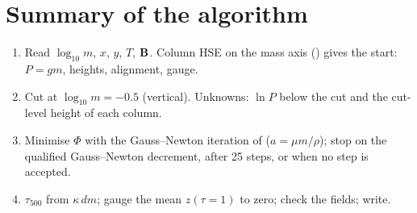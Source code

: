\adjointpoissontrue


\section{Summary of the algorithm}
\begin{enumerate}
\item Read $\log_{10}m$, $x$, $y$, $T$, $\mathbf B$. Column HSE on the mass axis () gives the start: $P=gm$, heights,
alignment, gauge.
\item Cut at $\log_{10}m=-0.5$ (vertical). Unknowns: $\ln P$ below the cut and the cut-level height of each column.
\item Minimise $\Phi$ with the Gauss--Newton iteration of  ($a=\mu m/\rho$); stop on the qualified
Gauss--Newton decrement, after 25 steps, or when no step is accepted.
\item $\tau_{500}$ from $\kappa\,dm$; gauge the mean $z(\tau{=}1)$ to zero; check the fields; write.
\end{enumerate}

